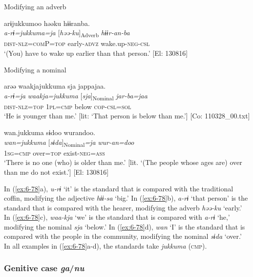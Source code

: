   Modifying an adverb

\ex
{\TM}
\glll arɨjukkumoo  həəku  hɨɨranba.\\
\textit{a-rɨ=jukkuma=ja}  [\textit{həə-ku}]\textsubscript{Adverb}  \textit{hɨɨr-an-ba}\\
\textsc{dist}-\textsc{nlz}=\textsc{com}P=\textsc{top}  early-\textsc{advz}  wake.up-\textsc{neg}-\textsc{csl}\\
\glt ‘(You) have to wake up earlier than that person.’ [El: 130816]

  Modifying a nominal

\ex
{\TM}
\glll arəə  waakjajukkuma  sja  jappajaa.\\
\textit{a-rɨ=ja}  \textit{waakja=jukkuma}  [\textit{sja}]\textsubscript{Nominal}  \textit{jar-ba=jaa}\\
\textsc{dist}-\textsc{nlz}=\textsc{top}  1\textsc{pl}=\textsc{cmp}  below  \textsc{cop}-\textsc{csl}=\textsc{sol}\\
\glt ‘He is younger than me.’ [lit: ‘That person is below than me.’]      [Co: 110328\_00.txt]
\z

\ex
{\TM}
\glll wan.jukkuma  sɨdoo  wurandoo.\\
\textit{wan=jukkuma}  [\textit{sɨda}]\textsubscript{Nominal}\textit{=ja}  \textit{wur-an=doo}\\
1\textsc{sg}=\textsc{cmp}  over=\textsc{top}  exist-\textsc{neg}=\textsc{ass}\\
\glt ‘There is no one (who) is older than me.’
[lit. ‘(The people whose ages are) over than me do not exist.’]      [El: 130816]
\z

In (\ref{ex:6-78}a), \textit{u-rɨ} ‘it’ is the standard that is compared with the traditional coffin, modifying the adjective \textit{hɨɨ-sa} ‘big.’ In (\ref{ex:6-78}b), \textit{a-rɨ} ‘that person’ is the standard that is compared with the hearer, modifying the adverb \textit{həə-ku} ‘early.’ In (\ref{ex:6-78}c), \textit{waa-kja} ‘we’ is the standard that is compared with \textit{a-rɨ} ‘he,’ modifying the nominal \textit{sja} ‘below.’ In (\ref{ex:6-78}d), \textit{wan} ‘I’ is the standard that is compared with the people in the community, modifying the nominal \textit{sɨda} ‘over.’ In all examples in (\ref{ex:6-78}a-d), the standards take \textit{jukkuma} (\textsc{cmp}).

\subsubsection{ Genitive case \textit{ga}/\textit{nu}}

